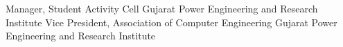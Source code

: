\begin{cvhonors}
    \cvhonor
    {Manager, Student Activity Cell}
    {Gujarat Power Engineering and Research Institute}
    {}
    {}
    \cvhonor
    {Vice President, Association of Computer Engineering}
    {Gujarat Power Engineering and Research Institute}
    {}
    {}
\end{cvhonors}